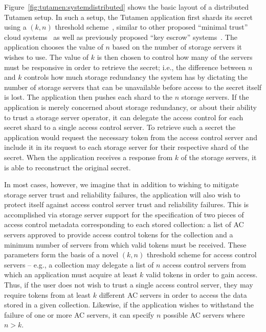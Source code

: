 Figure~\ref{fig:tutamen:systemdistributed} shows the basic layout of a
distributed Tutamen setup. In such a setup, the Tutamen application
first shards its secret using a $(k, n)$ threshold
scheme~\cite{krawczyk1993, shamir1979}, similar to other proposed
``minimal trust'' cloud systems~\cite{bessani2011} as well as
previously proposed ``key escrow'' systems~\cite{blaze1996,
  denning1996}. The application chooses the value of $n$ based on the
number of storage servers it wishes to use. The value of $k$ is
then chosen to control how many of the servers must be responsive in
order to retrieve the secret; i.e., the difference between $n$ and
$k$ controls how much storage redundancy the system has by dictating
the number of storage servers that can be unavailable before access to
the secret itself is lost. The application then pushes each shard to
the $n$ storage servers. If the application is merely concerned about
storage redundancy, or about their ability to trust a storage server
operator, it can delegate the access control for each secret shard to
a single access control server. To retrieve such a secret the
application would request the necessary token from the access control
server and include it in its request to each storage server for their
respective shard of the secret. When the application receives a
response from $k$ of the storage servers, it is able to reconstruct
the original secret.

In most cases, however, we imagine that in addition to wishing to
mitigate storage server trust and reliability failures, the
application will also wish to protect itself against access control
server trust and reliability failures. This is accomplished via
storage server support for the specification of two pieces of access
control metadata corresponding to each stored collection: a list of AC
servers approved to provide access control tokens for the collection
and a minimum number of servers from which valid tokens must be
received. These parameters form the basis of a novel $(k, n)$
threshold scheme for access control servers -- e.g., a collection may
delegate a list of $n$ access control servers from which an
application must acquire at least $k$ valid tokens in order to gain
access. Thus, if the user does not wish to trust a single access
control server, they may require tokens from at least $k$ different AC
servers in order to access the data stored in a given
collection. Likewise, if the application wishes to withstand the
failure of one or more AC servers, it can specify $n$ possible AC
servers where $n > k$.

